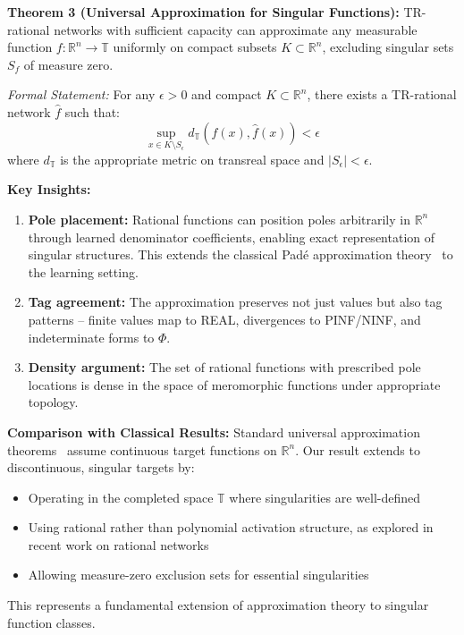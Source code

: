\documentclass[twoside,11pt]{article}
\newcommand{\trReal}{\textsc{REAL}}
\newcommand{\trPINF}{\textsc{PINF}}
\newcommand{\trNINF}{\textsc{NINF}}
\newcommand{\trPHI}{\textsc{$\Phi$}}
\newcommand{\TAGREAL}{\trReal}
\newcommand{\TAGPINF}{\trPINF}
\newcommand{\TAGNINF}{\trNINF}
\newcommand{\TAGPHI}{\trPHI}
\begin{document}
\textbf{Theorem 3 (Universal Approximation for Singular Functions):} TR-rational networks with sufficient capacity can approximate any measurable function $f: \mathbb{R}^n \to \mathbb{T}$ uniformly on compact subsets $K \subset \mathbb{R}^n$, excluding singular sets $S_f$ of measure zero.

\emph{Formal Statement:} For any $\epsilon > 0$ and compact $K \subset \mathbb{R}^n$, there exists a TR-rational network $\hat{f}$ such that:
$$\sup_{x \in K \setminus S_\epsilon} d_{\mathbb{T}}(f(x), \hat{f}(x)) < \epsilon$$
where $d_{\mathbb{T}}$ is the appropriate metric on transreal space and $|S_\epsilon| < \epsilon$.

\textbf{Key Insights:}
\begin{enumerate}
\item \textbf{Pole placement:} Rational functions can position poles arbitrarily in $\mathbb{R}^n$ through learned denominator coefficients, enabling exact representation of singular structures. This extends the classical Padé approximation theory~\citep{baker1996pade} to the learning setting.
\item \textbf{Tag agreement:} The approximation preserves not just values but also tag patterns -- finite values map to \TAGREAL, divergences to \TAGPINF/\TAGNINF, and indeterminate forms to \TAGPHI.
\item \textbf{Density argument:} The set of rational functions with prescribed pole locations is dense in the space of meromorphic functions under appropriate topology.
\end{enumerate}

\textbf{Comparison with Classical Results:}
Standard universal approximation theorems~\citep{cybenko1989approximation,hornik1989multilayer,pinkus1999approximation} assume continuous target functions on $\mathbb{R}^n$. Our result extends to discontinuous, singular targets by:
\begin{itemize}
\item Operating in the completed space $\mathbb{T}$ where singularities are well-defined
\item Using rational rather than polynomial activation structure, as explored in recent work on rational networks~\citep{boulle2020rational,telgarsky2017neural}
\item Allowing measure-zero exclusion sets for essential singularities
\end{itemize}

This represents a fundamental extension of approximation theory to singular function classes.
\end{document}
